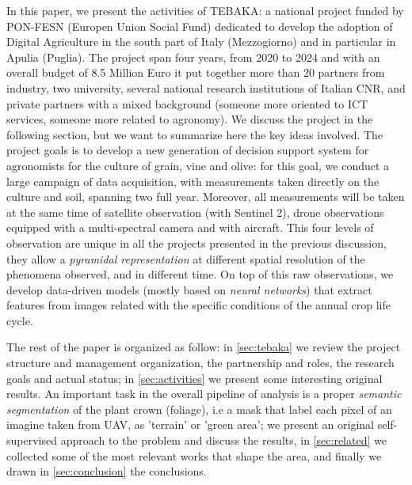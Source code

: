 \documentclass[comsoc,final]{IEEEtran}
\begin{document}
In this paper, we present the activities of \textsc{TEBAKA}: a national project funded by PON-FESN (Europen Union Social Fund) dedicated to develop the adoption of Digital Agriculture in the south part of Italy (Mezzogiorno) and in particular in Apulia (Puglia). The project span four years, from 2020 to 2024 and with an overall budget of 8.5 Million Euro it put together more than 20 partners from industry, two university, several national research institutions of Italian CNR, and private partners with a mixed background (someone more oriented to ICT services, someone more related to agronomy). 
We discuss the project in the following section, but we want to summarize here the key ideas involved. The project goals is to develop a new generation of decision support system for agronomists for the culture of grain, vine and olive: for this goal, we conduct a large campaign of data acquisition, with measurements taken directly on the culture and soil, spanning two full year. Moreover, all measurements will be taken at the same time of satellite observation (with Sentinel 2), drone observations equipped with a multi-spectral camera and with aircraft. This four levels of observation are unique in all the projects presented in the previous discussion, they allow a \emph{pyramidal representation} at different spatial resolution of the phenomena observed, and in different time. On top of this raw observations, we develop data-driven models (mostly based on \emph{neural networks}) that extract features from images related with the specific conditions of the annual crop life cycle.

The rest of the paper is organized as follow: in \ref{sec:tebaka} we review the project structure and management organization, the partnership and roles, the research goals and actual status; in \ref{sec:activities} we present some interesting original results. An important task in the overall pipeline of analysis is a proper \emph{semantic segmentation} of the plant crown (foliage), i.e a mask that label each pixel of an imagine taken from UAV, as 'terrain' or 'green area'; we present an original self-supervised approach to the problem and discuss the results, in \ref{sec:related} we collected some of the most relevant works that shape the area, and finally we drawn in \ref{sec:conclusion} the conclusions.
\end{document}
